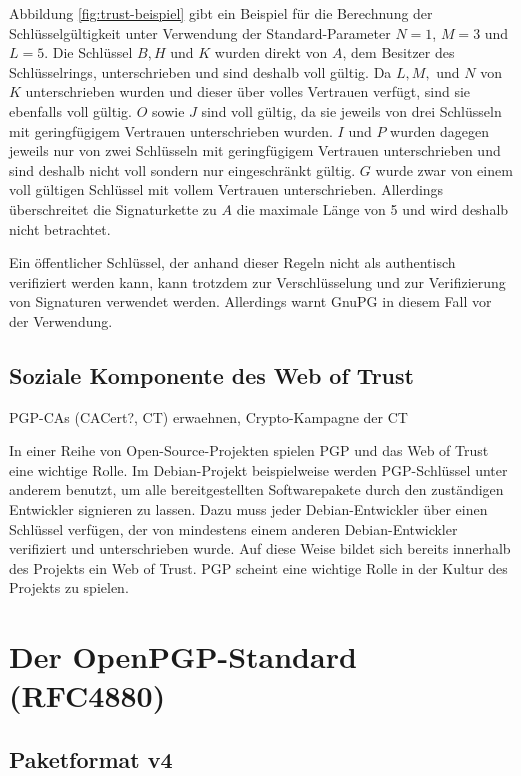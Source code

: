 Abbildung \ref{fig:trust-beispiel} gibt ein Beispiel für die
Berechnung der Schlüsselgültigkeit unter Verwendung der
Standard-Parameter $N=1$, $M=3$ und $L=5$. Die Schlüssel $B, H$ und
$K$ wurden direkt von $A$, dem Besitzer des Schlüsselrings,
unterschrieben und sind deshalb voll gültig. Da $L, M,$ und $N$ von
$K$ unterschrieben wurden und dieser über volles Vertrauen verfügt,
sind sie ebenfalls voll gültig. $O$ sowie $J$ sind voll gültig, da sie
jeweils von drei Schlüsseln mit geringfügigem Vertrauen unterschrieben
wurden. $I$ und $P$ wurden dagegen jeweils nur von zwei Schlüsseln mit
geringfügigem Vertrauen unterschrieben und sind deshalb nicht voll
sondern nur eingeschränkt gültig. $G$ wurde zwar von einem voll
gültigen Schlüssel mit vollem Vertrauen unterschrieben. Allerdings
überschreitet die Signaturkette zu $A$ die maximale Länge von 5 und
wird deshalb nicht betrachtet.

Ein öffentlicher Schlüssel, der anhand dieser Regeln nicht als
authentisch verifiziert werden kann, kann trotzdem zur Verschlüsselung
und zur Verifizierung von Signaturen verwendet werden. Allerdings
warnt GnuPG in diesem Fall vor der Verwendung.

\subsection{Soziale Komponente des Web of Trust}
\label{sec:sozi-komp-des}

PGP-CAs (CACert?, CT) erwaehnen, Crypto-Kampagne der CT

In einer Reihe von Open-Source-Projekten spielen PGP und das Web of
Trust eine wichtige Rolle. Im Debian-Projekt beispielweise werden
PGP-Schl\"ussel unter anderem benutzt, um alle bereitgestellten
Softwarepakete durch den zust\"andigen Entwickler signieren zu
lassen. Dazu muss jeder Debian-Entwickler \"uber einen Schl\"ussel
verf\"ugen, der von mindestens einem anderen Debian-Entwickler
verifiziert und unterschrieben wurde. Auf diese Weise bildet sich
bereits innerhalb des Projekts ein Web of Trust. PGP scheint eine
wichtige Rolle in der Kultur des Projekts zu spielen. 



\section{Der OpenPGP-Standard (RFC4880)}
\label{ch:Grundlagen:sec:OpenPGP}

\subsection{Paketformat v4}
\label{ch:Grundlagen:sec:OpenPGP:subsec:PaketFormat}

